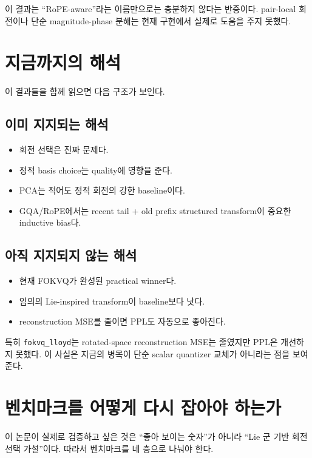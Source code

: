 \documentclass[11pt,a4paper]{article}
\begin{document}
이 결과는 ``RoPE-aware''라는 이름만으로는 충분하지 않다는 반증이다. pair-local 회전이나 단순 magnitude-phase 분해는 현재 구현에서 실제로 도움을 주지 못했다.

\section{지금까지의 해석}

이 결과들을 함께 읽으면 다음 구조가 보인다.

\subsection{이미 지지되는 해석}

\begin{itemize}
\item 회전 선택은 진짜 문제다.
\item 정적 basis choice는 quality에 영향을 준다.
\item PCA는 적어도 정적 회전의 강한 baseline이다.
\item GQA/RoPE에서는 recent tail + old prefix structured transform이 중요한 inductive bias다.
\end{itemize}

\subsection{아직 지지되지 않는 해석}

\begin{itemize}
\item 현재 FOKVQ가 완성된 practical winner다.
\item 임의의 Lie-inspired transform이 baseline보다 낫다.
\item reconstruction MSE를 줄이면 PPL도 자동으로 좋아진다.
\end{itemize}

특히 \texttt{fokvq\_lloyd}는 rotated-space reconstruction MSE는 줄였지만 PPL은 개선하지 못했다. 이 사실은 지금의 병목이 단순 scalar quantizer 교체가 아니라는 점을 보여 준다.

\section{벤치마크를 어떻게 다시 잡아야 하는가}

이 논문이 실제로 검증하고 싶은 것은 ``좋아 보이는 숫자''가 아니라 ``Lie 군 기반 회전 선택 가설''이다. 따라서 벤치마크를 네 층으로 나눠야 한다.
\end{document}
